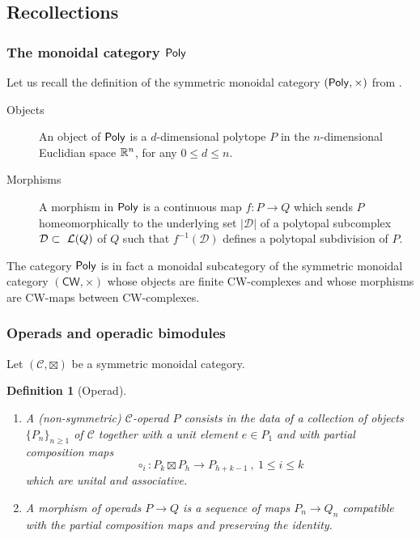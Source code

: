 \documentclass[twoside, 12pt]{amsart}
\newtheorem{definition}{Definition}[section]
\theoremstyle{remark}
\begin{document}
 
\subsection{Recollections}

\subsubsection{The monoidal category $\mathsf{Poly}$}

Let us recall the definition of the symmetric monoidal category $(\mathsf{Poly}, \times)$ from \cite[Section~2.1]{MTTV19}.
\begin{description}
\item[{\sc Objects}] An object of $\mathsf{Poly}$ is a $d$-dimensional  polytope $P$ in the $n$-dimensional Euclidian space $\mathbb{R}^n$, for any $0\leq d\leq n$.
\item[{\sc Morphisms}] A morphism in $\mathsf{Poly}$ is a continuous map  $f: P\to Q$ which sends  $P$ homeomorphically to the underlying set $|\mathcal{D}|$ of a polytopal subcomplex $\mathcal{D}\subset~\mathcal{L}(Q)$ of $Q$ 
such that $f^{-1}(\mathcal D)$ defines a polytopal subdivision of $P$.
\end{description}
The category $\mathsf{Poly}$ is in fact a monoidal subcategory of the symmetric monoidal category $(\mathsf{CW},\times )$ whose objects are finite CW-complexes and whose morphisms are CW-maps between CW-complexes.

\subsubsection{Operads and operadic bimodules}

Let $(\mathcal{C},\boxtimes )$ be a symmetric monoidal category.

\begin{definition}[Operad]
\begin{enumerate}[leftmargin=*]
\item A \emph{(non-symmetric) $\mathcal{C}$-operad} $P$ consists in the data of a collection of objects $\{ P_n \}_{n \geqslant 1}$ of $\mathcal{C}$ together with a unit element $e \in P_1$ and with partial composition maps
\[ \circ_i : P_k \boxtimes P_h \longrightarrow P_{h+k-1} \ , \ 1 \leqslant i \leqslant k  \]
which are unital and associative.
\item A \emph{morphism of operads} $P \rightarrow Q$ is a sequence of maps $P_n \rightarrow Q_n$ compatible with the partial composition maps and preserving the identity.
\end{enumerate}
\end{definition}
\end{document}

